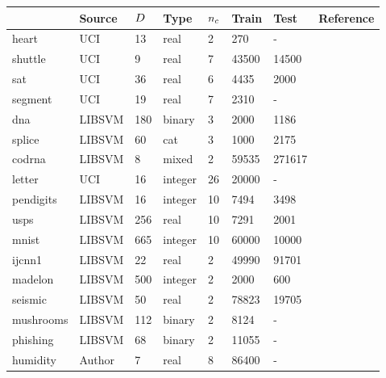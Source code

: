 \begin{tabular}{|l|lllllll|}
	\hline
	& Source & $D$ & Type & $n_c$ & Train & Test & Reference \\\hline
	heart & UCI & 13 & real & 2 & 270 & - & {\small \citep{Lichman2013}}\\
	shuttle & UCI & 9 & real & 7 & 43500 & 14500 & {\small \citep{King_etal1995}}\\
	sat & UCI & 36 & real & 6 & 4435 & 2000 & {\small \citep{King_etal1995}}\\
	segment & UCI & 19 & real & 7 & 2310 & - & {\small \citep{King_etal1995}} \\
	dna & LIBSVM & 180 & binary & 3 & 2000 & 1186 & {\small \citep{Michie_etal1994}}\\
	splice & LIBSVM & 60 & cat & 3 & 1000 & 2175 & {\small \citep{Michie_etal1994}}\\
	codrna & LIBSVM & 8 & mixed & 2 & 59535 & 271617 & {\small \citep{Uzilov_etal2006}}\\
	letter & UCI & 16 & integer & 26 & 20000 & - & {\small \citep{Frey_Slate1991}}\\
	pendigits & LIBSVM & 16 & integer & 10 & 7494 & 3498 & {\small \citep{Alimoglu1996}}\\
	usps & LIBSVM & 256 & real & 10 & 7291 & 2001 & {\small \citep{Hull1994}}\\
	mnist & LIBSVM & 665 & integer & 10 & 60000 & 10000 & {\small \citep{LeCun_etal1998}}\\
	ijcnn1 & LIBSVM & 22 & real & 2 & 49990 & 91701 & {\small \citep{Feldkamp_Puskorius1998}}\\
	madelon & LIBSVM & 500 & integer & 2 & 2000 & 600 & {\small \citep{Guyon_etal2004}}\\
	seismic & LIBSVM & 50 & real & 2 & 78823 & 19705 & {\small \citep{Duarte_Hu2004}}\\
	mushrooms & LIBSVM & 112 & binary & 2 & 8124 & - & {\small \citep{Iba_etal1988}}\\
	phishing & LIBSVM & 68 & binary & 2 & 11055 & - & {\small \citep{Mohommad_etal2014}}\\
	humidity & Author & 7 & real & 8 & 86400 & - & {\small \citep{Mills2009}}\\
	\hline
\end{tabular}

